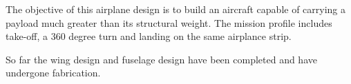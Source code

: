 \abstract 

\vspace*{10pt}

\noindent 

The objective of this airplane design is to build an aircraft capable of carrying
a payload much greater than its structural weight. The mission profile includes
take-off, a 360 degree turn and landing on the same airplance strip.

So far the wing design and fuselage design have been completed and have undergone fabrication. 
